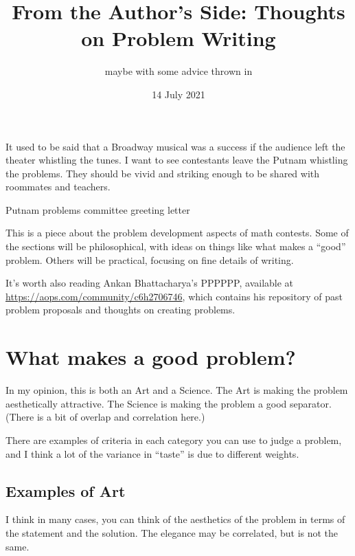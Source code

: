 \documentclass[11pt]{scrartcl}
\theoremstyle{inlined}
\begin{document}
\title{From the Author's Side: Thoughts on Problem Writing}
\subtitle{maybe with some advice thrown in}
\date{14 July 2021}
\maketitle

\epigraph{It used to be said that a Broadway musical was
  a success if the audience left the theater whistling the tunes.
  I want to see contestants leave the Putnam whistling the problems.
  They should be vivid and striking enough to be shared with roommates and teachers.}
  {Putnam problems committee greeting letter}

This is a piece about the problem development aspects of math contests.
Some of the sections will be philosophical,
with ideas on things like what makes a ``good'' problem.
Others will be practical, focusing on fine details of writing.

It's worth also reading Ankan Bhattacharya's PPPPPP,
available at \url{https://aops.com/community/c6h2706746},
which contains his repository of past problem proposals
and thoughts on creating problems.

\tableofcontents
\pagebreak

\section{What makes a good problem?}
In my opinion, this is both an Art and a Science.
The Art is making the problem aesthetically attractive.
The Science is making the problem a good separator.
(There is a bit of overlap and correlation here.)

There are examples of criteria in each category
you can use to judge a problem,
and I think a lot of the variance in ``taste'' is due to different weights.

\subsection{Examples of Art}
I think in many cases, you can think of the aesthetics
of the problem in terms of the statement and the solution.
The elegance may be correlated, but is not the same.
\end{document}
